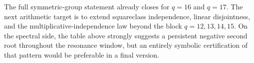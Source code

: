 \begin{remark}
\label{rem:q16q17}
The full symmetric-group statement already closes for \(q=16\) and \(q=17\).
The next arithmetic target is to extend squareclass independence, linear
disjointness, and the multiplicative-independence law beyond the block
\(q=12,13,14,15\).  On the spectral side, the table above strongly suggests a
persistent negative second root throughout the resonance window, but an
entirely symbolic certification of that pattern would be preferable in a final
version.
\end{remark}
